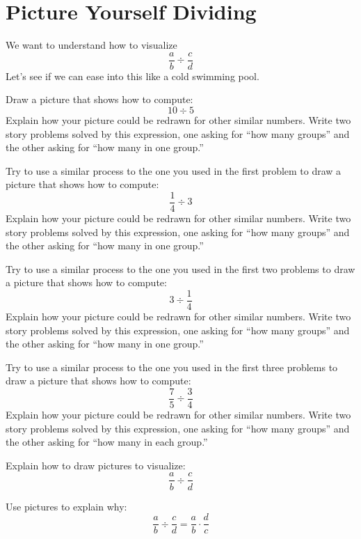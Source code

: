 \newpage
\section{Picture Yourself Dividing}


We want to understand how to visualize 
\[
\frac{a}{b} \div \frac{c}{d}
\]
Let's see if we can ease into this like a cold swimming pool.

\begin{prob}
Draw a picture that shows how to compute:
\[
10\div 5
\]
Explain how your picture could be redrawn for other similar
numbers. Write two story problems solved by this expression, one
asking for ``how many groups'' and the other asking for ``how many in
one group.''
\end{prob}

\begin{prob}
Try to use a similar process to the one you used in the first problem
to draw a picture that shows how to compute:
\[
\frac{1}{4} \div 3
\]
Explain how your picture could be redrawn for other similar numbers.
Write two story problems solved by this expression, one asking for
``how many groups'' and the other asking for ``how many in one
group.''
\end{prob}


\begin{prob}
Try to use a similar process to the one you used in the first two problems
to draw a picture that shows how to compute:
\[
3 \div \frac{1}{4}
\]
Explain how your picture could be redrawn for other similar numbers.
Write two story problems solved by this expression, one asking for
``how many groups'' and the other asking for ``how many in one
group.''
\end{prob}


\begin{prob}
Try to use a similar process to the one you used in the first three problems
to draw a picture that shows how to compute:
\[
\frac{7}{5} \div \frac{3}{4}
\]
Explain how your picture could be redrawn for other similar numbers.
Write two story problems solved by this expression, one asking for
``how many groups'' and the other asking for ``how many in each
group.''
\end{prob}

\begin{prob}
Explain how to draw pictures to visualize:
\[
\frac{a}{b} \div \frac{c}{d}
\]
\end{prob}

\begin{prob}
Use pictures to explain why:
\[
\frac{a}{b} \div \frac{c}{d} = \frac{a}{b} \cdot \frac{d}{c}
\]
\end{prob}
